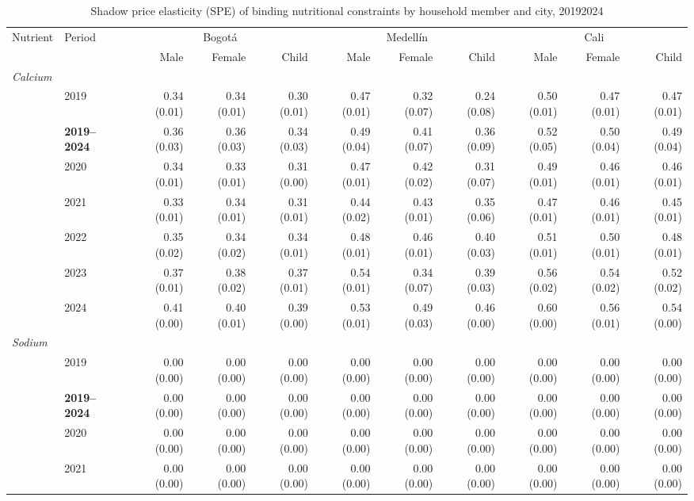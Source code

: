 \begin{table}[htbp]
\centering\small\setlength{\tabcolsep}{3pt}
\caption{Shadow price elasticity (SPE) of binding nutritional constraints by household member and city, 2019\textendash{}2024}
\label{tab:shadow_prices}
\begin{tabular}{llrrrrrrrrr}
\toprule
Nutrient & Period & \multicolumn{3}{c}{Bogotá} & \multicolumn{3}{c}{Medellín} & \multicolumn{3}{c}{Cali} \\
 &  & Male & Female & Child & Male & Female & Child & Male & Female & Child \\
\midrule
\multicolumn{11}{l}{\textit{Calcium}} \\
 & 2019 & 0.34 (0.01) & 0.34 (0.01) & 0.30 (0.01) & 0.47 (0.01) & 0.32 (0.07) & 0.24 (0.08) & 0.50 (0.01) & 0.47 (0.01) & 0.47 (0.01) \\
 & \textbf{2019–2024} & 0.36 (0.03) & 0.36 (0.03) & 0.34 (0.03) & 0.49 (0.04) & 0.41 (0.07) & 0.36 (0.09) & 0.52 (0.05) & 0.50 (0.04) & 0.49 (0.04) \\
 & 2020 & 0.34 (0.01) & 0.33 (0.01) & 0.31 (0.00) & 0.47 (0.01) & 0.42 (0.02) & 0.31 (0.07) & 0.49 (0.01) & 0.46 (0.01) & 0.46 (0.01) \\
 & 2021 & 0.33 (0.01) & 0.34 (0.01) & 0.31 (0.01) & 0.44 (0.02) & 0.43 (0.01) & 0.35 (0.06) & 0.47 (0.01) & 0.46 (0.01) & 0.45 (0.01) \\
 & 2022 & 0.35 (0.02) & 0.34 (0.02) & 0.34 (0.01) & 0.48 (0.01) & 0.46 (0.01) & 0.40 (0.03) & 0.51 (0.01) & 0.50 (0.01) & 0.48 (0.01) \\
 & 2023 & 0.37 (0.01) & 0.38 (0.02) & 0.37 (0.01) & 0.54 (0.01) & 0.34 (0.07) & 0.39 (0.03) & 0.56 (0.02) & 0.54 (0.02) & 0.52 (0.02) \\
 & 2024 & 0.41 (0.00) & 0.40 (0.01) & 0.39 (0.00) & 0.53 (0.01) & 0.49 (0.03) & 0.46 (0.00) & 0.60 (0.00) & 0.56 (0.01) & 0.54 (0.00) \\
\midrule
\multicolumn{11}{l}{\textit{Sodium}} \\
 & 2019 & 0.00 (0.00) & 0.00 (0.00) & 0.00 (0.00) & 0.00 (0.00) & 0.00 (0.00) & 0.00 (0.00) & 0.00 (0.00) & 0.00 (0.00) & 0.00 (0.00) \\
 & \textbf{2019–2024} & 0.00 (0.00) & 0.00 (0.00) & 0.00 (0.00) & 0.00 (0.00) & 0.00 (0.00) & 0.00 (0.00) & 0.00 (0.00) & 0.00 (0.00) & 0.00 (0.00) \\
 & 2020 & 0.00 (0.00) & 0.00 (0.00) & 0.00 (0.00) & 0.00 (0.00) & 0.00 (0.00) & 0.00 (0.00) & 0.00 (0.00) & 0.00 (0.00) & 0.00 (0.00) \\
 & 2021 & 0.00 (0.00) & 0.00 (0.00) & 0.00 (0.00) & 0.00 (0.00) & 0.00 (0.00) & 0.00 (0.00) & 0.00 (0.00) & 0.00 (0.00) & 0.00 (0.00) \\

\end{tabular}
\end{table}
